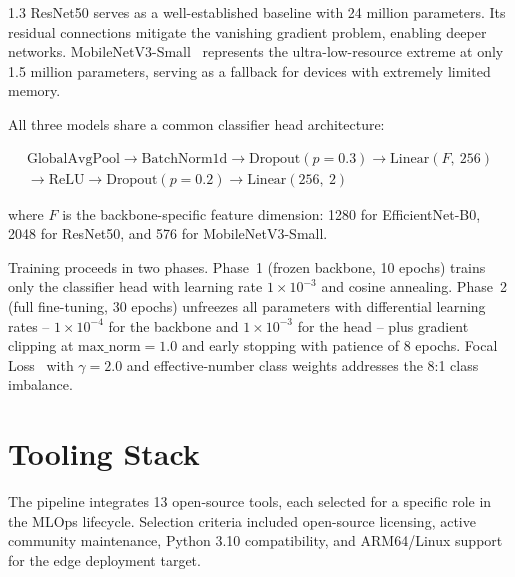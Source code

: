 \begin{spacing}{1.3}
ResNet50 serves as a well-established baseline with 24 million parameters. Its residual connections mitigate the vanishing gradient problem, enabling deeper networks. MobileNetV3-Small~\cite{howard2019} represents the ultra-low-resource extreme at only 1.5 million parameters, serving as a fallback for devices with extremely limited memory.

All three models share a common classifier head architecture:

\[
\begin{aligned}
\text{GlobalAvgPool} \rightarrow \text{BatchNorm1d} \rightarrow \text{Dropout}(p=0.3) \rightarrow \text{Linear}(F,~256) \\
\rightarrow \text{ReLU} \rightarrow \text{Dropout}(p=0.2) \rightarrow \text{Linear}(256,~2)
\end{aligned}
\]

where \(F\) is the backbone-specific feature dimension: 1280 for EfficientNet-B0, 2048 for ResNet50, and 576 for MobileNetV3-Small.

Training proceeds in two phases. Phase~1 (frozen backbone, 10 epochs) trains only the classifier head with learning rate \(1 \times 10^{-3}\) and cosine annealing. Phase~2 (full fine-tuning, 30 epochs) unfreezes all parameters with differential learning rates -- \(1 \times 10^{-4}\) for the backbone and \(1 \times 10^{-3}\) for the head -- plus gradient clipping at \(\text{max\_norm}=1.0\) and early stopping with patience of 8 epochs. Focal Loss~\cite{lin2017} with \(\gamma = 2.0\) and effective-number class weights addresses the 8:1 class imbalance.

\section{Tooling Stack}

The pipeline integrates 13 open-source tools, each selected for a specific role in the MLOps lifecycle. Selection criteria included open-source licensing, active community maintenance, Python 3.10 compatibility, and ARM64/Linux support for the edge deployment target.


\end{spacing}
